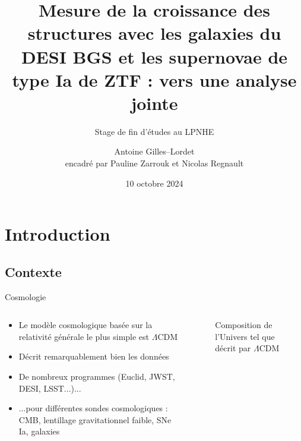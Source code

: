 \documentclass{beamer}
\title[Mesure de la croissance des structures avec DESI et ZTF]{Mesure de la croissance des structures avec les galaxies du DESI BGS et les supernovae de type Ia de ZTF : vers une analyse jointe}
\subtitle{Stage de fin d'études au LPNHE}
\author[Antoine Gilles-{}-Lordet]{Antoine Gilles--Lordet \\ \footnotesize encadré par Pauline Zarrouk et Nicolas Regnault}
\date{10 octobre 2024}
\newcommand{\credits}[1]{\tiny Credits : #1}
\begin{document}
\frame{\titlepage}

\section{Introduction}

\subsection{Contexte}

\begin{frame}{Cosmologie}
\begin{columns}
\begin{column}{0.5\textwidth}
	\begin{itemize}
		\item 	Le modèle cosmologique basée sur la relativité générale le plus simple est $\Lambda$CDM
		\item Décrit remarquablement bien les données
		\item De nombreux programmes (Euclid, JWST, DESI, LSST...)...
		\item ...pour différentes sondes cosmologiques : CMB, lentillage gravitationnel faible, SNe Ia, galaxies
	\end{itemize}
\end{column}
\begin{column}{0.5\textwidth}
\begin{figure}
	\centering
	\caption{Composition de l'Univers tel que décrit par $\Lambda$CDM}
\end{figure}
\end{column}
\end{columns}
\end{frame}

\end{document}
